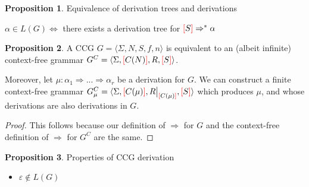 \documentclass[12pt]{extarticle}
\newcommand\restr[2]{{%
  \left.\kern-\nulldelimiterspace %
  #1 %
  \vphantom{\big|} %
  \right|_{#2} %
  }}
\theoremstyle{definition} \newtheorem{defn}{Definition}
\theoremstyle{definition} \newtheorem{prop}{Proposition}
\newcommand{\lb}{\textcolor{red}{[}}
\newcommand{\rb}{\textcolor{red}{]}}
\begin{document}
\begin{prop}
    Equivalence of derivation trees and derivations

    $\alpha \in L(G) \iff $ there exists a derivation tree for
    $ \lb S \rb \Rightarrow^* \alpha $
\end{prop}
\begin{prop}\label{prop:cfg}
    A CCG $G = \langle \Sigma, N, S, f, n \rangle$ is equivalent to an
    (albeit infinite) context-free grammar
    $G^C = \langle \Sigma, \lb C(N) \rb, R, \lb S \rb \rangle$.

    Moreover, let $\mu: \alpha_1 \Rightarrow ... \Rightarrow \alpha_r$
    be a derivation for $G$.
    We can construct a finite context-free grammar
    $G_\mu^C = \langle \Sigma, \lb C(\mu) \rb, \restr{R}{\lb C(\mu) \rb}, \lb S \rb \rangle$
    which produces $\mu$, and whose derivations are also derivations in $G$.
\end{prop}
\begin{proof}
    This follows because our definition of $\Rightarrow$ for $G$ and the context-free
    definition of $\Rightarrow$ for $G^C$ are the same.
\end{proof}

\begin{prop}
    Properties of CCG derivation
    \begin{itemize}
        \item $\varepsilon \notin L(G)$
    \end{itemize}
\end{prop}
\end{document}
